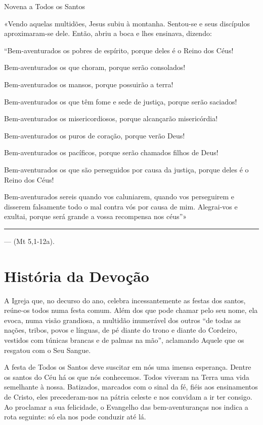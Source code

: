 \documentclass[a4paper,14pt]{extarticle} \usepackage[utf8]{inputenc}
\begin{document}
\begin{center}
  {\huge Novena a Todos os Santos}
\end{center}

  «Vendo aquelas multidões, Jesus subiu à montanha. Sentou-se e seus discípulos aproximaram-se dele. Então, abriu a boca e lhes ensinava, dizendo:

``Bem-aventurados os pobres de espírito, porque deles é o Reino dos Céus!

Bem-aventurados os que choram, porque serão consolados!

Bem-aventurados os mansos, porque possuirão a terra!

Bem-aventurados os que têm fome e sede de justiça, porque serão saciados!

Bem-aventurados os misericordiosos, porque alcançarão misericórdia!

Bem-aventurados os puros de coração, porque verão Deus!

Bem-aventurados os pacíficos, porque serão chamados filhos de Deus!

Bem-aventurados os que são perseguidos por causa da justiça, porque deles é o Reino dos Céus!


Bem-aventurados sereis quando vos caluniarem, quando vos perseguirem e disserem falsamente todo o mal contra vós por causa de mim. Alegrai-vos e exultai, porque será grande a vossa recompensa nos céus''»

\par\noindent\rule{\textwidth}{0.4pt}
--- (Mt 5,1-12a).

\tableofcontents
\thispagestyle{empty}

\newpage

\section{História da Devoção}

A Igreja que, no decurso do ano, celebra incessantemente as festas dos santos, reúne-os todos numa festa comum. Além dos que pode chamar pelo seu nome, ela evoca, numa visão grandiosa, a multidão inumerável dos outros “de todas as nações, tribos, povos e línguas, de pé diante do trono e diante do Cordeiro, vestidos com túnicas brancas e de palmas na mão”, aclamando Aquele que os resgatou com o Seu Sangue.

A festa de Todos os Santos deve suscitar em nós uma imensa esperança. Dentre os santos do Céu há os que nós conhecemos. Todos viveram na Terra uma vida semelhante à nossa. Batizados, marcados com o sinal da fé, fiéis aos ensinamentos de Cristo, eles precederam-nos na pátria celeste e nos convidam a ir ter consigo. Ao proclamar a sua felicidade, o Evangelho das bem-aventuranças nos indica a rota seguinte: só ela nos pode conduzir até lá.
\end{document}
